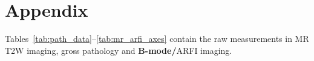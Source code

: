 \section{Appendix}\label{sect:appendix}

Tables~\ref{tab:path_data}--\ref{tab:mr_arfi_axes} contain the raw measurements in 
MR T2W imaging, gross pathology and \textbf{B-mode/}ARFI imaging.



\clearpage



\clearpage


